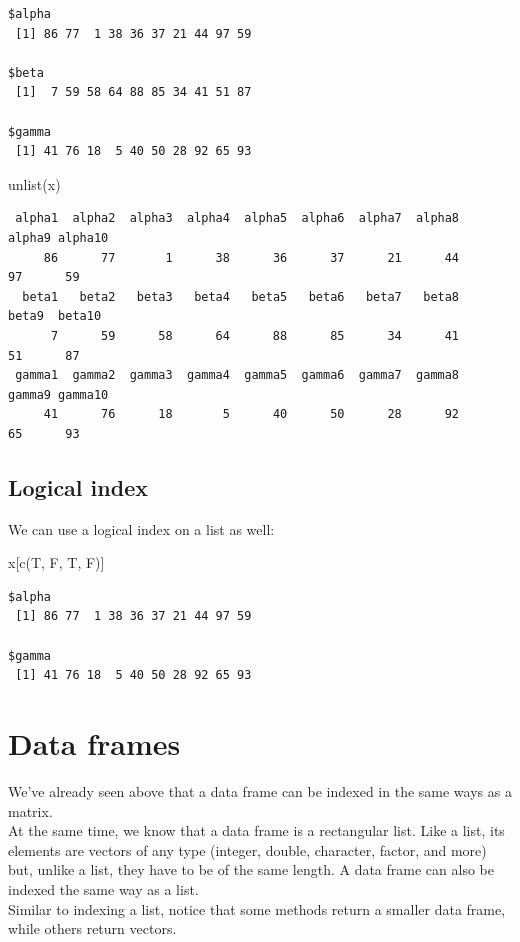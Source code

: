 \documentclass[
]{book}
\newenvironment{Shaded}{\begin{snugshade}}{\end{snugshade}}
\newcommand{\FunctionTok}[1]{\textcolor[rgb]{0.00,0.00,0.00}{#1}}
\newcommand{\NormalTok}[1]{#1}
\begin{document}
\begin{verbatim}
$alpha
 [1] 86 77  1 38 36 37 21 44 97 59

$beta
 [1]  7 59 58 64 88 85 34 41 51 87

$gamma
 [1] 41 76 18  5 40 50 28 92 65 93
\end{verbatim}

\begin{Shaded}
\begin{Highlighting}[]
\FunctionTok{unlist}\NormalTok{(x)}
\end{Highlighting}
\end{Shaded}

\begin{verbatim}
 alpha1  alpha2  alpha3  alpha4  alpha5  alpha6  alpha7  alpha8  alpha9 alpha10 
     86      77       1      38      36      37      21      44      97      59 
  beta1   beta2   beta3   beta4   beta5   beta6   beta7   beta8   beta9  beta10 
      7      59      58      64      88      85      34      41      51      87 
 gamma1  gamma2  gamma3  gamma4  gamma5  gamma6  gamma7  gamma8  gamma9 gamma10 
     41      76      18       5      40      50      28      92      65      93 
\end{verbatim}

\hypertarget{idllist}{%
\subsection{Logical index}\label{idllist}}

We can use a logical index on a list as well:

\begin{Shaded}
\begin{Highlighting}[]
\NormalTok{x[}\FunctionTok{c}\NormalTok{(T, F, T, F)]}
\end{Highlighting}
\end{Shaded}

\begin{verbatim}
$alpha
 [1] 86 77  1 38 36 37 21 44 97 59

$gamma
 [1] 41 76 18  5 40 50 28 92 65 93
\end{verbatim}

\hypertarget{indexdfs}{%
\section{Data frames}\label{indexdfs}}

We've already seen above that a data frame can be indexed in the same ways as a matrix.\\
At the same time, we know that a data frame is a rectangular list. Like a list, its elements are vectors of any type (integer, double, character, factor, and more) but, unlike a list, they have to be of the same length. A data frame can also be indexed the same way as a list.\\
Similar to indexing a list, notice that some methods return a smaller data frame, while others return vectors.
\end{document}
